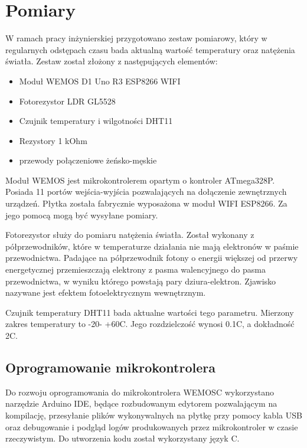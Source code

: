 \newpage
\section{Pomiary}

W ramach pracy inżynierskiej przygotowano zestaw pomiarowy, który 
w regularnych odstępach czasu bada aktualną wartość temperatury oraz
natężenia światła. Zestaw został złożony z następujących elementów:

\begin{itemize} %
    \item Moduł WEMOS D1 Uno R3 ESP8266 WIFI
    \item Fotorezystor LDR GL5528
    \item Czujnik temperatury i wilgotności DHT11
    \item Rezystory 1 kOhm
    \item przewody połączeniowe żeńsko-męskie
\end{itemize}

Moduł WEMOS jest mikrokontrolerem opartym o kontroler ATmega328P. Posiada
11 portów wejścia-wyjścia pozwalających na dołączenie zewnętrznych 
urządzeń. Płytka została fabrycznie wyposażona w moduł WIFI ESP8266. Za
jego pomocą mogą być wysyłane pomiary.

Fotorezystor służy do pomiaru natężenia światła. Został wykonany 
z półprzewodników, które w temperaturze działania nie mają elektronów 
w paśmie przewodnictwa. Padające na półprzewodnik fotony o energii 
większej od przerwy energetycznej przemieszczają elektrony z pasma 
walencyjnego do pasma przewodnictwa, w wyniku którego powstają pary 
dziura-elektron. Zjawisko nazywane jest efektem fotoelektrycznym 
wewnętrznym.

Czujnik temperatury DHT11 bada aktualne wartości tego
parametru. Mierzony zakres temperatury to -20\degree  - +60\degree C.
Jego rozdzielczość wynosi 0.1\degree C, a dokładność 2\degree C.

\subsection{Oprogramowanie mikrokontrolera}

Do rozwoju oprogramowania do mikrokontrolera WEMOSC wykorzystano narzędzie 
Arduino IDE, będące rozbudowanym edytorem pozwalającym na kompilację,
przesyłanie plików wykonywalnych na płytkę przy pomocy kabla USB oraz
debugowanie i podgląd logów produkowanych przez mikrokontroler w czasie 
rzeczywistym. Do utworzenia kodu został wykorzystany język C.

